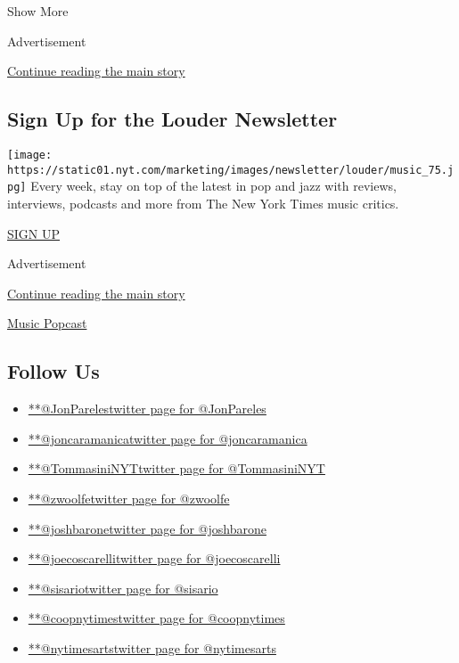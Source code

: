 Show More

Advertisement

\protect\hyperlink{after-mid2}{Continue reading the main story}

\hypertarget{sign-up-for-the-louder-newsletter}{%
\subsection{Sign Up for the Louder
Newsletter}\label{sign-up-for-the-louder-newsletter}}

\texttt{[image: https://static01.nyt.com/marketing/images/newsletter/louder/music\_75.jpg]}
Every week, stay on top of the latest in pop and jazz with reviews,
interviews, podcasts and more from The New York Times music critics.

\href{/newsletters/signup/MS}{SIGN UP}

Advertisement

\protect\hyperlink{after-mktg}{Continue reading the main story}

\href{http://www.nytimes.com/column/popcast-pop-music-podcast}{Music
Popcast}

\hypertarget{follow-us}{%
\subsection{Follow Us}\label{follow-us}}

\begin{itemize}
\tightlist
\item
  \href{https://twitter.com/JonPareles}{**@JonParelestwitter page for
  @JonPareles}
\item
  \href{https://twitter.com/joncaramanica}{**@joncaramanicatwitter page
  for @joncaramanica}
\item
  \href{https://twitter.com/TommasiniNYT}{**@TommasiniNYTtwitter page
  for @TommasiniNYT}
\item
  \href{https://twitter.com/zwoolfe}{**@zwoolfetwitter page for
  @zwoolfe}
\item
  \href{https://twitter.com/joshbarone}{**@joshbaronetwitter page for
  @joshbarone}
\item
  \href{https://twitter.com/joecoscarelli}{**@joecoscarellitwitter page
  for @joecoscarelli}
\item
  \href{https://twitter.com/sisario}{**@sisariotwitter page for
  @sisario}
\item
  \href{https://twitter.com/coopnytimes}{**@coopnytimestwitter page for
  @coopnytimes}
\item
  \href{https://twitter.com/nytimesarts}{**@nytimesartstwitter page for
  @nytimesarts}
\end{itemize}


